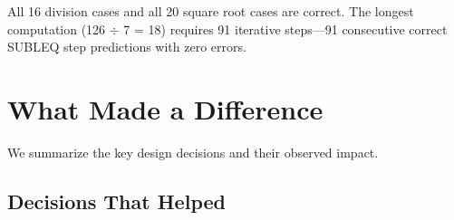 \documentclass[11pt,a4paper]{article}
\begin{document}
All 16 division cases and all 20 square root cases are correct.
The longest computation (126 $\div$ 7 = 18) requires 91 iterative steps---91 consecutive correct SUBLEQ step predictions with zero errors.

\section{What Made a Difference}
\label{sec:ablations}

We summarize the key design decisions and their observed impact.

\subsection{Decisions That Helped}
\end{document}
